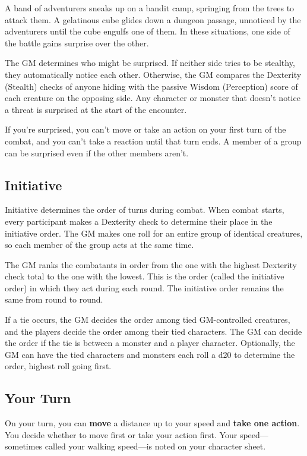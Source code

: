 A band of adventurers sneaks up on a bandit camp, springing from the trees to attack them. A gelatinous cube glides down a dungeon passage, unnoticed by the adventurers until the cube engulfs one of them. In these situations, one side of the battle gains surprise over the other.

The GM determines who might be surprised. If neither side tries to be stealthy, they automatically notice each other. Otherwise, the GM compares the Dexterity (Stealth) checks of anyone hiding with the passive Wisdom (Perception) score of each creature on the opposing side. Any character or monster that doesn't notice a threat is surprised at the start of the encounter.

If you're surprised, you can't move or take an action on your first turn of the combat, and you can't take a reaction until that turn ends. A member of a group can be surprised even if the other members aren't.

\subsection{Initiative}

Initiative determines the order of turns during combat. When combat starts, every participant makes a Dexterity check to determine their place in the initiative order. The GM makes one roll for an entire group of identical creatures, so each member of the group acts at the same time.

The GM ranks the combatants in order from the one with the highest Dexterity check total to the one with the lowest. This is the order (called the initiative order) in which they act during each round. The initiative order remains the same from round to round.

If a tie occurs, the GM decides the order among tied GM-controlled creatures, and the players decide the order among their tied characters. The GM can decide the order if the tie is between a monster and a player character. Optionally, the GM can have the tied characters and monsters each roll a d20 to determine the order, highest roll going first.

\subsection{Your Turn}

On your turn, you can \textbf{move} a distance up to your speed and \textbf{take one action}. You decide whether to move first or take your action first. Your speed— sometimes called your walking speed—is noted on your character sheet.

